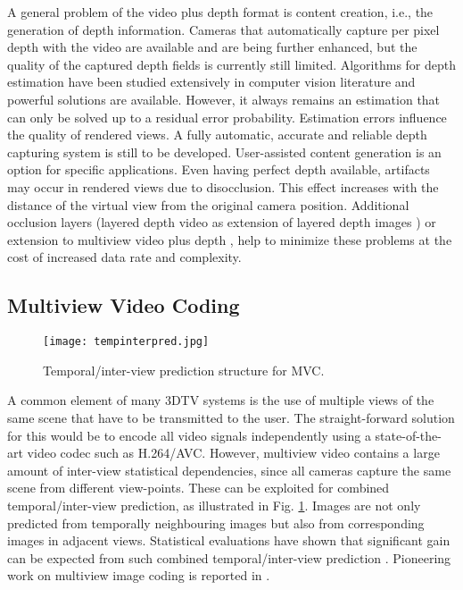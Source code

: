 A general problem of the video plus depth format is content creation, i.e., the generation of depth information. Cameras that automatically capture per pixel depth with the video are available and are being further enhanced, but the quality of the captured depth fields is currently still limited. Algorithms for depth estimation have been studied extensively in computer vision literature and powerful solutions are available. However, it always remains an estimation that can only be solved up to a residual error probability. Estimation errors influence the quality of rendered views. A fully automatic, accurate and reliable depth capturing system is still to be developed. User-assisted content generation is an option for specific applications. Even having perfect depth available, artifacts may occur in rendered views due to disocclusion. This effect increases with the distance of the virtual view from the original camera position. Additional occlusion layers (layered depth video as extension of layered depth images ) or extension to multiview video plus depth , help to minimize these problems at the cost of increased data rate and complexity.

\subsection{Multiview Video Coding}

\begin{figure}[htbp]
\begin{center}
\texttt{[image: tempinterpred.jpg]}
\caption{Temporal/inter-view prediction structure for MVC.}
\label{fig:tempinterpred}
\end{center}
\end{figure}

A common element of many 3DTV systems is the use of multiple views of the same scene that have to be transmitted to the user. The straight-forward solution for this would be to encode all video signals independently using a state-of-the-art video codec such as H.264/AVC. However, multiview video contains a large amount of inter-view statistical dependencies, since all cameras capture the same scene from different view-points. These can be exploited for combined temporal/inter-view prediction, as illustrated in Fig. \ref{fig:tempinterpred}. Images are not only predicted from temporally neighbouring images but also from corresponding images in adjacent views. Statistical evaluations have shown that significant gain can be expected from such combined temporal/inter-view prediction . Pioneering work on multiview image coding is reported in .

